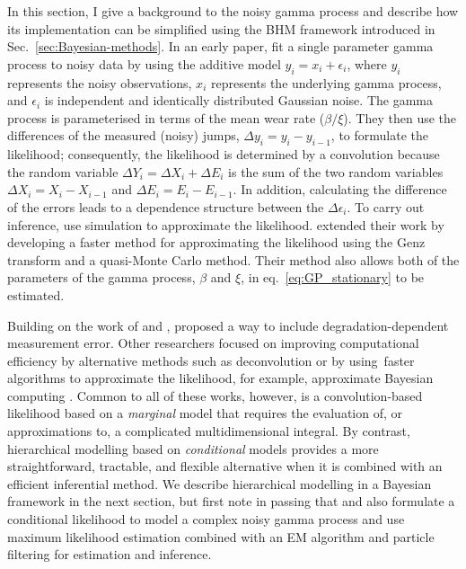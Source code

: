 In this section, I give a background to the noisy gamma process and describe how its implementation can be simplified using the BHM framework introduced in Sec.~\ref{sec:Bayesian-methods}. In an early paper, \citet{kallen2005} fit a single parameter gamma process to noisy data by using the additive model $y_i = x_i + \epsilon_i$, where $y_i$ represents the noisy observations, $x_i$ represents the underlying gamma process, and $\epsilon_i$ is independent and identically distributed Gaussian noise. The gamma process is parameterised in terms of the mean wear rate ($\beta / \xi $). They then use the differences of the measured (noisy) jumps, $\Delta y_i = y_i - y_{i-1}$, to formulate the likelihood; consequently, the likelihood is determined by a convolution because the random variable $\Delta Y_i = \Delta X_i + \Delta E_i$ is the sum of the two random variables $\Delta X_i = X_i - X_{i-1}$ and $\Delta E_i = E_i - E_{i-1}$. In addition, calculating the difference of the errors leads to a dependence structure between the $\Delta \epsilon_i$. To carry out inference, \citet{kallen2005} use simulation to approximate the likelihood. \citet{lu2013} extended their work by developing a faster method for approximating the likelihood using the Genz transform and a quasi-Monte Carlo method. Their method also allows both of the parameters of the gamma process, $\beta$ and $\xi$, in eq.~\eqref{eq:GP_stationary} to be estimated.

Building on the work of \citet{kallen2005} and \citet{lu2013}, \citet{pulcini2016} proposed a way to include degradation-dependent measurement error. Other researchers focused on improving computational efficiency by alternative methods such as deconvolution \citep{rodriguez-picon2021} or by using faster algorithms to approximate the likelihood, for example, approximate Bayesian computing \citep{hazra2020, hazra2022}. Common to all of these works, however, is a convolution-based likelihood based on a \emph{marginal} model that requires the evaluation of, or approximations to, a complicated multidimensional integral. By contrast, hierarchical modelling based on \emph{conditional} models provides a more straightforward, tractable, and flexible alternative when it is combined with an efficient inferential method. We describe hierarchical modelling in a Bayesian framework in the next section, but first note in passing that \citet{giorgio2019} and \citet{esposito2022} also formulate a conditional likelihood to model a complex noisy gamma process and use maximum likelihood estimation combined with an EM algorithm and particle filtering for estimation and inference.

